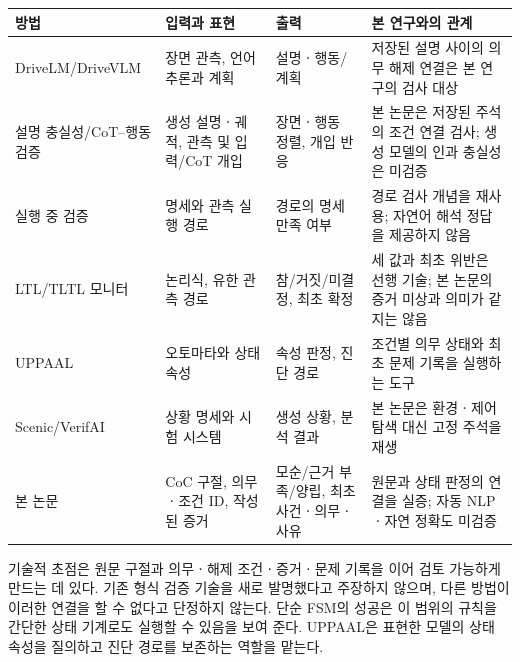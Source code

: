 \begin{revision}
\begin{table}[t]
\centering
\color{revisionblue}
\label{tab:related-position}
\scriptsize
\begin{tabularx}{\textwidth}{L{.21\textwidth}L{.24\textwidth}L{.24\textwidth}Y}
\toprule
방법 & 입력과 표현 & 출력 & 본 연구와의 관계 \\
\midrule
DriveLM/DriveVLM \cite{sima2024drivelm,tian2024drivevlm} & 장면 관측, 언어 추론과 계획 & 설명ㆍ행동/계획 & 저장된 설명 사이의 의무 해제 연결은 본 연구의 검사 대상 \\
설명 충실성/CoT--행동 검증 \cite{mayumu2026faithfulness,nguyen2026vladrivebench} & 생성 설명ㆍ궤적, 관측 및 입력/CoT 개입 & 장면ㆍ행동 정렬, 개입 반응 & 본 논문은 저장된 주석의 조건 연결 검사; 생성 모델의 인과 충실성은 미검증 \\
실행 중 검증 \cite{leucker2009runtime} & 명세와 관측 실행 경로 & 경로의 명세 만족 여부 & 경로 검사 개념을 재사용; 자연어 해석 정답을 제공하지 않음 \\
LTL/TLTL 모니터 \cite{bauer2011runtime} & 논리식, 유한 관측 경로 & 참/거짓/미결정, 최초 확정 & 세 값과 최초 위반은 선행 기술; 본 논문의 증거 미상과 의미가 같지는 않음 \\
UPPAAL \cite{behrmann2004uppaal} & 오토마타와 상태 속성 & 속성 판정, 진단 경로 & 조건별 의무 상태와 최초 문제 기록을 실행하는 도구 \\
Scenic/VerifAI \cite{fremont2019scenic,dreossi2019verifai} & 상황 명세와 시험 시스템 & 생성 상황, 분석 결과 & 본 논문은 환경ㆍ제어 탐색 대신 고정 주석을 재생 \\
본 논문 & CoC 구절, 의무ㆍ조건 ID, 작성된 증거 & 모순/근거 부족/양립, 최초 사건ㆍ의무ㆍ사유 & 원문과 상태 판정의 연결을 실증; 자동 NLPㆍ자연 정확도 미검증 \\
\bottomrule
\end{tabularx}
\end{table}

기술적 초점은 원문 구절과 의무ㆍ해제 조건ㆍ증거ㆍ문제 기록을 이어 검토 가능하게 만드는 데 있다. 기존 형식 검증 기술을 새로 발명했다고 주장하지 않으며, 다른 방법이 이러한 연결을 할 수 없다고 단정하지 않는다. 단순 FSM의 성공은 이 범위의 규칙을 간단한 상태 기계로도 실행할 수 있음을 보여 준다. UPPAAL은 표현한 모델의 상태 속성을 질의하고 진단 경로를 보존하는 역할을 맡는다.
\end{revision}
